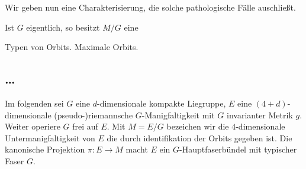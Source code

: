 Wir geben nun eine Charakterisierung, die solche pathologische
Fälle auschließt.
\begin{theorem}
Ist $G$ eigentlich, so besitzt $M/G$ eine
\end{theorem}
Typen von Orbits. Maximale Orbits.
\begin{theorem}
\end{theorem}
\begin{theorem}
\end{theorem}
\subsection{\ldots}
Im folgenden sei $G$ eine $d$-dimensionale kompakte Liegruppe, $E$ eine
$(4+d)$-dimensionale (pseudo-)riemannsche $G$-Manigfaltigkeit mit $G$
invarianter Metrik $g$. Weiter operiere $G$ frei auf $E$. Mit $M=E/G$ bezeichen
wir die $4$-dimensionale Untermanigfaltigkeit von $E$ die durch identifikation
der Orbits gegeben ist. Die kanonische Projektion $\pi:E\to M$ macht $E$ ein
$G$-Hauptfaserbündel mit typischer Faser $G$.

